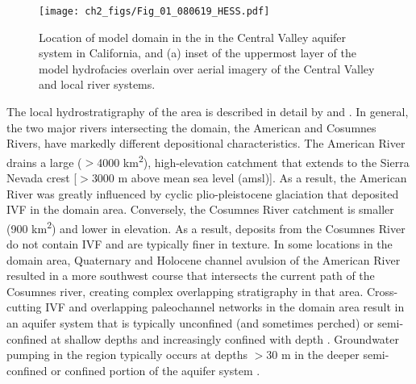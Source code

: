 \begin{figure*}[t]
\centering
\texttt{[image: ch2\_figs/Fig\_01\_080619\_HESS.pdf]}
\caption{Location of model domain in the in the Central Valley aquifer system in California, and (a) inset of the uppermost layer of the model hydrofacies overlain over aerial imagery of the Central Valley and local river systems.}
\label{fig:domain}
\end{figure*}

The local hydrostratigraphy of the area is described in detail by \cite{meirovitz2010thesis} and \cite{maples_2019}. In general, the two major rivers intersecting the domain, the American and Cosumnes Rivers, have markedly different depositional characteristics. The American River drains a large ($>$4000 km\textsuperscript{2}), high-elevation catchment that extends to the Sierra Nevada crest [$>$3000 m above mean sea level (amsl)]. As a result, the American River was greatly influenced by cyclic plio-pleistocene glaciation that deposited IVF in the domain area. Conversely, the Cosumnes River catchment is smaller (900  km\textsuperscript{2}) and lower in elevation. As a result, deposits from the Cosumnes River do not contain IVF and are typically finer in texture. In some locations in the domain area, Quaternary and Holocene channel avulsion of the American River resulted in a more southwest course that intersects the current path of the Cosumnes river, creating complex overlapping stratigraphy in that area. Cross-cutting IVF and overlapping paleochannel networks in the domain area result in an aquifer system that is typically unconfined (and sometimes perched) or semi-confined at shallow depths and increasingly confined with depth  \citep{fleckenstein2006river,liu2014thesis,niswonger2008influence}. Groundwater pumping in the region typically occurs at depths $>$30 m in the deeper semi-confined or confined portion of the aquifer system \citep{liu2014thesis}.

